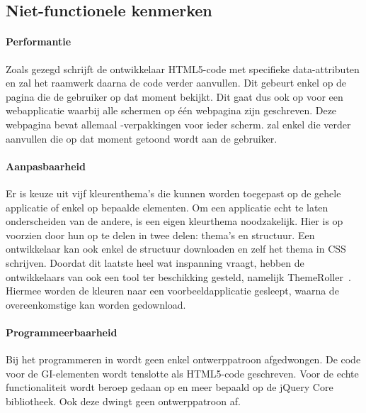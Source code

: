 \subsection{Niet-functionele kenmerken}
\paragraph{Performantie}
Zoals gezegd schrijft de ontwikkelaar HTML5-code met specifieke data-attributen en zal het raamwerk daarna de code verder aanvullen. 
Dit gebeurt enkel op de pagina die de gebruiker op dat moment bekijkt. 
Dit gaat dus ook op voor een webapplicatie waarbij alle schermen op één webpagina zijn geschreven. 
Deze webpagina bevat allemaal -verpakkingen voor ieder scherm. 
\jqm{} zal enkel die  verder aanvullen die op dat moment getoond wordt aan de gebruiker. 

\paragraph{Aanpasbaarheid}
Er is keuze uit vijf kleurenthema's die kunnen worden toegepast op de gehele applicatie of enkel op bepaalde elementen. 
Om een applicatie echt te laten onderscheiden van de andere, is een eigen kleurthema noodzakelijk. 
Hier is \jqm{} op voorzien door hun  op te delen in twee delen: thema's en structuur. 
Een ontwikkelaar kan ook enkel de structuur downloaden en zelf het thema in CSS schrijven. 
Doordat dit laatste heel wat inspanning vraagt, hebben de ontwikkelaars van \jqm{} ook een tool ter beschikking gesteld, namelijk ThemeRoller~\cite{JQuery2012c}. 
Hiermee worden de kleuren naar een voorbeeldapplicatie gesleept, waarna de overeenkomstige  kan worden gedownload.

\paragraph{Programmeerbaarheid}
Bij het programmeren in \jqm{} wordt geen enkel ontwerppatroon afgedwongen. 
De code voor de GI-elementen wordt tenslotte als HTML5-code geschreven. 
Voor de echte functionaliteit wordt beroep gedaan op \js{} en meer bepaald op de jQuery Core bibliotheek. 
Ook deze dwingt geen ontwerppatroon af.

